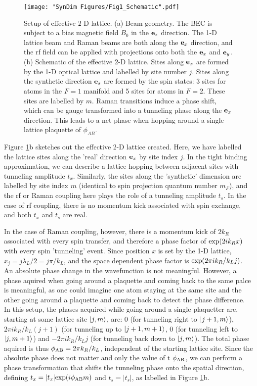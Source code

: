 \begin{figure}
	\texttt{[image: "SynDim Figures/Fig1\_Schematic".pdf]}
\caption{Setup of effective 2-D lattice. (a) Beam geometry. The BEC is subject to a bias magnetic field $B_0$ in the ${\bf e}_z$ direction. The 1-D lattice beam and Raman beams are both along the ${\bf e}_x$ direction, and the rf field can be applied with projections onto both the  ${\bf e}_x$ and  ${\bf e}_y$. (b) Schematic of the effective 2-D lattice. Sites along  ${\bf e}_x$ are formed by the 1-D optical lattice and labelled by site number $j$. Sites along the synthetic direction  ${\bf e}_s$ are formed by the spin states: 3 sites for atoms in the $F=1$ manifold and 5 sites for atoms in $F=2$. These sites are labelled by $m$. Raman transitions induce a phase shift, which can be gauge transformed into a tunneling phase along the  ${\bf e}_x$ direction. This leads to a net phase when hopping around a single lattice plaquette of $\phi_{AB}$.  }
\label{fig:synDimSchematic}
\end{figure}


Figure \ref{fig:synDimSchematic}b sketches out the effective 2-D lattice created. Here, we have labelled the lattice sites along the 'real' direction  ${\bf e}_x$ by site index $j$. In the tight binding approximation, we can describe a lattice hopping between adjacent sites with tunneling amplitude $t_x$. Similarly, the sites along the 'synthetic' dimension are labelled by site index $m$ (identical to spin projection quantum number $m_F$), and the rf or Raman coupling here plays the role of a tunneling amplitude $t_s$. In the case of rf coupling, there is no momentum kick associated with spin exchange, and both $t_x$ and $t_s$ are real. 

In the case of Raman coupling, however, there is a momentum kick of $2k_R$ associated with every spin transfer, and therefore a phase factor of ${\rm exp}(2i k_R x)$ with every spin 'tunneling' event. Since position $x$ is set by the 1-D lattice, $x_j = j \lambda_L/2 = j \pi/k_L$, and the space dependent phase factor is ${\rm exp}(2\pi i k_R/k_L j)$. An absolute phase change in the wavefunction is not meaningful. However, a phase aquired when going around a plaquette and coming back to the same palce is meaningful, as one could imagine one atom staying at the same site and the other going around a plaquette and coming back to detect the phase difference. In this setup, the phases acquired while going around a single plaquetter are, starting at some lattice site $\mathinner{|{j,m}\rangle}$, are: $0$ (for tunneling right to $\mathinner{|{j+1,m}\rangle}$), $2\pi i k_R/k_L (j+1)$ (for tunneling up to $\mathinner{|{j+1,m+1}\rangle}$, $0$ (for tunneling left to $\mathinner{|{j,m+1}\rangle}$) and $-2\pi i k_R/k_L j$ (for tunneling back down to $\mathinner{|{j,m}\rangle}$). The total phase aquired is thus $\phi_{\rm AB} = 2\pi k_R/k_L$, independent of the starting lattice site. Since the absolute phase does not matter and only the value of t $\phi_{\rm AB}$, we can perform a phase transformation that shifts the tunneling phase onto the spatial direction, defining $t_x = |t_x|{\rm exp}(i\phi_{\rm AB}m)$ and $t_s=|t_s|$, as labelled in Figure \ref{fig:synDimSchematic}b. 

